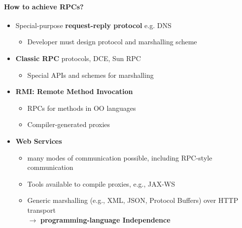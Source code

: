 \paragraph{How to achieve RPCs?}
\begin{itemize}
\item Special-purpose \textbf{request-reply protocol} e.g. DNS
  \begin{itemize}
  \item Developer must design protocol and marshalling scheme
  \end{itemize}

\item \textbf{Classic RPC} protocols, DCE, Sun RPC
  \begin{itemize}
  \item Special APIs and schemes for marshalling
  \end{itemize}

\item \textbf{RMI: Remote Method Invocation}
  \begin{itemize}
  \item RPCs for methods in OO languages
  \item Compiler-generated proxies
  \end{itemize}

\item \textbf{Web Services}
  \begin{itemize}
  \item many modes of communication possible, including RPC-style
    communication
  \item Tools available to compile proxies, e.g., JAX-WS
  \item Generic marshalling (e.g., XML, JSON, Protocol Buffers)
    over HTTP transport \\
    $\rightarrow$ \textbf{programming-language Independence}
  \end{itemize}
\end{itemize}

